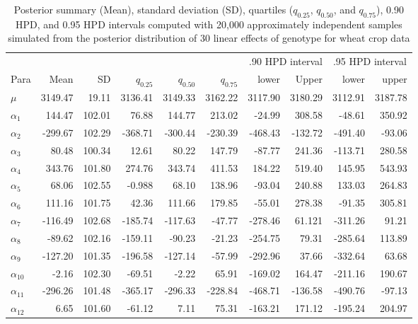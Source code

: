 \begin{table}[h!]
	\centering
	\caption[HPD table for genotypes]{Posterior summary (Mean), standard deviation (SD), quartiles ($q_{0.25}$, $q_{0.50}$, and $q_{0.75}$), 0.90 HPD,  and 0.95 HPD intervals computed with 20,000 approximately independent samples simulated from the posterior distribution of 30 linear effects of genotype for wheat crop data}
	\label{Table:4.4}
	\begin{tabular}{l r r r r r r r r r} 
		\toprule
		&&&&	&&\multicolumn{2}{r}{.90 HPD interval} 
		&\multicolumn{2}{c}{ .95 HPD interval}  \\
		\cmidrule(r){7-8}  \cmidrule(lr){9-10} 
		Para & Mean & SD & $q_{0.25}$ &$q_{0.50}$ & $q_{0.75}$ & lower & Upper & lower & upper\\
		\midrule
		$\mu$       & 3149.47&	19.11 &	3136.41	& 3149.33 &	3162.22 & 3117.90 & 3180.29& 3112.91& 3187.78  \\
		$\alpha_1$  & 144.47 & 102.01 &	76.88   & 144.77  &	213.02	& -24.99  &	308.58 &-48.61  & 350.92\\
		$\alpha_2$  & -299.67& 102.29 &-368.71  &-300.44  &-230.39  &-468.43  &	-132.72&-491.40 & -93.06\\
		$\alpha_3$  &  80.48 & 100.34 &	12.61   & 80.22   &	147.79  &-87.77	  & 241.36 &-113.71 & 280.58\\
		$\alpha_4$	& 343.76 & 101.80 &	274.76	& 343.74  &	411.53	& 184.22  &	519.40 & 145.95 & 543.93 \\
		$\alpha_5$	& 68.06  & 102.55 &-0.988	& 68.10	  & 138.96  &-93.04   &	240.88 & 133.03	& 264.83 \\
		$\alpha_6$	& 111.16 & 101.75 & 42.36	& 111.66  &	179.85  &-55.01   &	278.38 &-91.35  & 305.81 \\
		$\alpha_7$	&-116.49 & 102.68 &-185.74  &-117.63  &-47.77   &-278.46  &	61.121 &-311.26 & 91.21 \\
		$\alpha_8$	&-89.62  & 102.16 &-159.11  &-90.23   &-21.23   &-254.75  &	79.31  &-285.64 & 113.89\\
		$\alpha_9$	&-127.20 & 101.35 &	-196.58 &-127.14  &	-57.99  &-292.96  &	37.66  &-332.64 & 63.68\\
		$\alpha_{10}$&-2.16  & 102.30 &-69.51   &-2.22    &	65.91   &-169.02  &	164.47 &-211.16 & 190.67\\
		$\alpha_{11}$&-296.26& 101.48 &-365.17  &-296.33  &-228.84  &-468.71  &-136.58 &-490.76 &-97.13\\
		$\alpha_{12}$& 6.65  & 101.60 &-61.12   & 7.11    &	75.31   &-163.21  & 171.12 &-195.24 &	204.97\\

\end{tabular}
\end{table}
